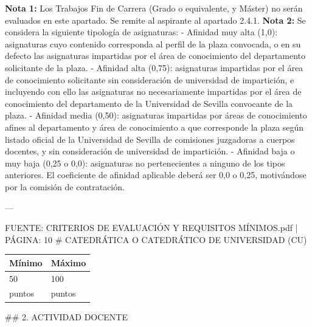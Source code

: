 \documentclass{article}
\begin{document}
\begin{itemize}
\begin{itemize}
\begin{scriptsize}
                  \textbf{Nota 1:} Los Trabajos Fin de Carrera (Grado o equivalente, y Máster) no serán evaluados en este apartado. Se remite al aspirante al apartado 2.4.1.
                  \textbf{Nota 2:} Se considera la siguiente tipología de asignaturas:
                  - Afinidad muy alta (1,0): asignaturas cuyo contenido corresponda al perfil de la plaza convocada, o en su defecto las asignaturas impartidas por el área de conocimiento del departamento solicitante de la plaza.
                  - Afinidad alta  (0,75): asignaturas impartidas por el área de conocimiento solicitante sin consideración de universidad de impartición, e incluyendo con ello las asignaturas no necesariamente impartidas por el área de conocimiento del departamento de la Universidad de Sevilla convocante de la plaza.
                  - Afinidad media  (0,50): asignaturas impartidas por áreas de conocimiento afines al departamento y área de conocimiento a que corresponde la plaza según listado oficial de la Universidad de Sevilla de comisiones juzgadoras a cuerpos docentes, y sin consideración de universidad de impartición.
                  - Afinidad baja o muy baja      (0,25 o 0,0): asignaturas no pertenecientes a ninguno de los tipos anteriores. El coeficiente de afinidad aplicable deberá ser 0,0 o 0,25, motivándose por la comisión de contratación.

                  ---

                  FUENTE: CRITERIOS DE EVALUACIÓN Y REQUISITOS MÍNIMOS.pdf | PÁGINA: 10
                  \# CATEDRÁTICA O CATEDRÁTICO DE UNIVERSIDAD (CU)

                  \vspace{0.4cm}
                  \begin{table}[h!]\centering\renewcommand{\arraystretch}{1.3}
                    \begin{tabular}{|p{}|p{}|}\hline
                      Mínimo & Máximo \\\hline
                      50     & 100    \\\hline
                      puntos & puntos \\\hline
                    \end{tabular}\end{table}
                  \vspace{0.4cm}

                  \#\# 2. ACTIVIDAD DOCENTE


\end{scriptsize}
\end{itemize}
\end{itemize}
\end{document}
